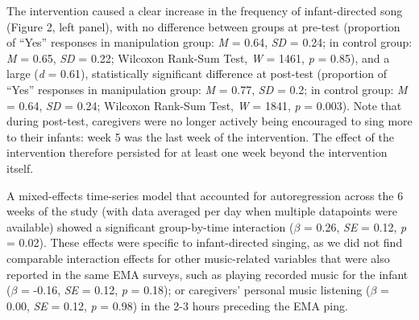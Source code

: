 \documentclass[
]{article}
\begin{document}
The intervention caused a clear increase in the frequency of
infant-directed song (Figure 2, left panel), with no difference between
groups at pre-test (proportion of ``Yes'' responses in manipulation
group: \emph{M} = 0.64, \emph{SD} = 0.24; in control group: \emph{M} =
0.65, \emph{SD} = 0.22; Wilcoxon Rank-Sum Test, \emph{W} = 1461,
\emph{p} = 0.85), and a large (\emph{d} = 0.61), statistically
significant difference at post-test (proportion of ``Yes'' responses in
manipulation group: \emph{M} = 0.77, \emph{SD} = 0.2; in control group:
\emph{M} = 0.64, \emph{SD} = 0.24; Wilcoxon Rank-Sum Test, \emph{W} =
1841, \emph{p} = 0.003). Note that during post-test, caregivers were no
longer actively being encouraged to sing more to their infants: week 5
was the last week of the intervention. The effect of the intervention
therefore persisted for at least one week beyond the intervention
itself.

A mixed-effects time-series model that accounted for autoregression
across the 6 weeks of the study (with data averaged per day when
multiple datapoints were available) showed a significant group-by-time
interaction (\(\beta\) = 0.26, \emph{SE} = 0.12, \emph{p} = 0.02). These
effects were specific to infant-directed singing, as we did not find
comparable interaction effects for other music-related variables that
were also reported in the same EMA surveys, such as playing recorded
music for the infant (\(\beta\) = -0.16, \emph{SE} = 0.12, \emph{p} =
0.18); or caregivers' personal music listening (\(\beta\) = 0.00,
\emph{SE} = 0.12, \emph{p} = 0.98) in the 2-3 hours preceding the EMA
ping.
\end{document}
